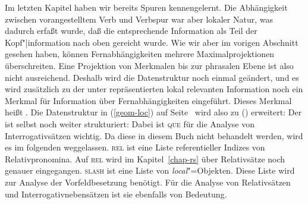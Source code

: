 Im letzten Kapitel haben wir bereits Spuren kennengelernt. Die Abhängigkeit zwischen vorangestelltem
Verb und Verbspur war aber lokaler Natur, was dadurch erfaßt wurde, daß die entsprechende Information
als Teil der Kopf"|information nach oben gereicht wurde. Wie wir aber im vorigen Abschnitt gesehen haben,
können Fernabhängigkeiten mehrere Maximalprojektionen überschreiten. Eine Projektion von Merkmalen
bis zur phrasalen Ebene ist also nicht ausreichend. Deshalb wird die Datenstruktur noch einmal geändert,
und es wird zusätzlich zu der unter \local repräsentierten lokal relevanten Information noch ein
Merkmal für Information über Fernabhängigkeiten eingeführt. Dieses Merkmal heißt \nonloc.
Die Datenstruktur in (\ref{geom-loc}) auf Seite~\pageref{geom-loc} wird also zu () erweitert:
\ea
\label{geom-nonloc}
\z
Der \nonlocw ist selbst noch weiter strukturiert:
\ea
{}
\z
Dabei ist \textsc{que} für die Analyse von Interrogativsätzen wichtig. Da diese in diesem Buch nicht behandelt
werden, wird es im folgenden weggelassen. \textsc{rel} ist eine Liste referentieller Indizes von Relativpronomina. Auf
\textsc{rel} wird im Kapitel~\ref{chap-rs} über Relativsätze noch genauer eingegangen.
\textsc{slash} ist eine Liste von \textit{local\/}"=Objekten. Diese Liste wird zur Analyse
der Vorfeldbesetzung benötigt. Für die Analyse von Relativsätzen und Interrogativnebensätzen
ist sie ebenfalls von Bedeutung.



